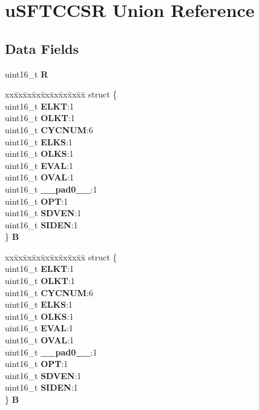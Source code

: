 \hypertarget{unionuSFTCCSR}{}\section{u\+S\+F\+T\+C\+C\+SR Union Reference}
\label{unionuSFTCCSR}
\subsection*{Data Fields}
\begin{DoxyCompactItemize}
\item 
\mbox{\label{unionuSFTCCSR_a50293de7d62cd405ed2e0c4f20b9e0b5}} 
uint16\+\_\+t {\bfseries R}
\item 
\mbox{\label{unionuSFTCCSR_a312b196bce58ae44fcb66d905876f88a}} 
\begin{tabbing}
xx\=xx\=xx\=xx\=xx\=xx\=xx\=xx\=xx\=\kill
struct \{\\
\>uint16\_t {\bfseries ELKT}:1\\
\>uint16\_t {\bfseries OLKT}:1\\
\>uint16\_t {\bfseries CYCNUM}:6\\
\>uint16\_t {\bfseries ELKS}:1\\
\>uint16\_t {\bfseries OLKS}:1\\
\>uint16\_t {\bfseries EVAL}:1\\
\>uint16\_t {\bfseries OVAL}:1\\
\>uint16\_t {\bfseries \_\_pad0\_\_}:1\\
\>uint16\_t {\bfseries OPT}:1\\
\>uint16\_t {\bfseries SDVEN}:1\\
\>uint16\_t {\bfseries SIDEN}:1\\
\} {\bfseries B}\\

\end{tabbing}\item 
\mbox{\label{unionuSFTCCSR_ad3505d8e0536c38f9a99aea85928a7f5}} 
\begin{tabbing}
xx\=xx\=xx\=xx\=xx\=xx\=xx\=xx\=xx\=\kill
struct \{\\
\>uint16\_t {\bfseries ELKT}:1\\
\>uint16\_t {\bfseries OLKT}:1\\
\>uint16\_t {\bfseries CYCNUM}:6\\
\>uint16\_t {\bfseries ELKS}:1\\
\>uint16\_t {\bfseries OLKS}:1\\
\>uint16\_t {\bfseries EVAL}:1\\
\>uint16\_t {\bfseries OVAL}:1\\
\>uint16\_t {\bfseries \_\_pad0\_\_}:1\\
\>uint16\_t {\bfseries OPT}:1\\
\>uint16\_t {\bfseries SDVEN}:1\\
\>uint16\_t {\bfseries SIDEN}:1\\
\} {\bfseries B}\\


\end{tabbing}
\end{DoxyCompactItemize}
